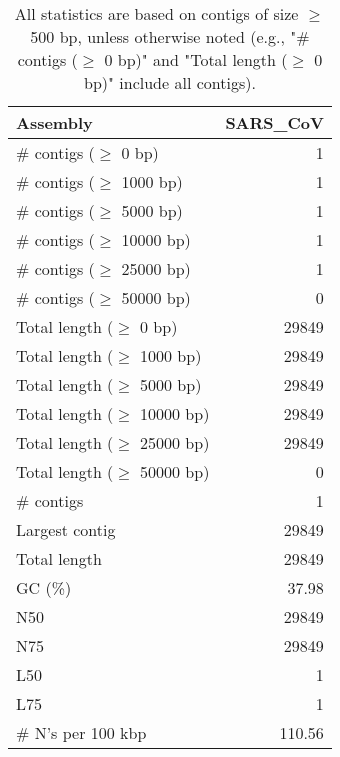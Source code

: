 \documentclass[12pt,a4paper]{article}
\begin{document}
\begin{table}[ht]
\begin{center}
\caption{All statistics are based on contigs of size $\geq$ 500 bp, unless otherwise noted (e.g., "\# contigs ($\geq$ 0 bp)" and "Total length ($\geq$ 0 bp)" include all contigs).}
\begin{tabular}{|l*{1}{|r}|}
\hline
Assembly & SARS\_CoV \\ \hline
\# contigs ($\geq$ 0 bp) & 1 \\ \hline
\# contigs ($\geq$ 1000 bp) & 1 \\ \hline
\# contigs ($\geq$ 5000 bp) & 1 \\ \hline
\# contigs ($\geq$ 10000 bp) & 1 \\ \hline
\# contigs ($\geq$ 25000 bp) & 1 \\ \hline
\# contigs ($\geq$ 50000 bp) & 0 \\ \hline
Total length ($\geq$ 0 bp) & 29849 \\ \hline
Total length ($\geq$ 1000 bp) & 29849 \\ \hline
Total length ($\geq$ 5000 bp) & 29849 \\ \hline
Total length ($\geq$ 10000 bp) & 29849 \\ \hline
Total length ($\geq$ 25000 bp) & 29849 \\ \hline
Total length ($\geq$ 50000 bp) & 0 \\ \hline
\# contigs & 1 \\ \hline
Largest contig & 29849 \\ \hline
Total length & 29849 \\ \hline
GC (\%) & 37.98 \\ \hline
N50 & 29849 \\ \hline
N75 & 29849 \\ \hline
L50 & 1 \\ \hline
L75 & 1 \\ \hline
\# N's per 100 kbp & 110.56 \\ \hline
\end{tabular}
\end{center}
\end{table}
\end{document}
